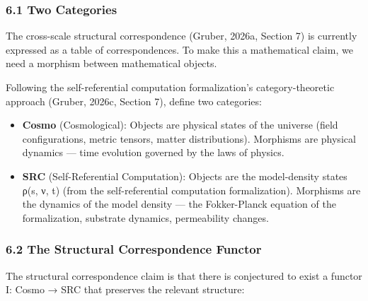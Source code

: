 \documentclass[
]{article}
\begin{document}
\hypertarget{two-categories}{%
\subsubsection{6.1 Two Categories}\label{two-categories}}

The cross-scale structural correspondence (Gruber, 2026a, Section 7) is
currently expressed as a table of correspondences. To make this a
mathematical claim, we need a morphism between mathematical objects.

Following the self-referential computation formalization's
category-theoretic approach (Gruber, 2026c, Section 7), define two
categories:

\begin{itemize}
\item
  \textbf{Cosmo} (Cosmological): Objects are physical states of the
  universe (field configurations, metric tensors, matter distributions).
  Morphisms are physical dynamics --- time evolution governed by the
  laws of physics.
\item
  \textbf{SRC} (Self-Referential Computation): Objects are the
  model-density states ρ(s, ν, t) (from the self-referential computation
  formalization). Morphisms are the dynamics of the model density ---
  the Fokker-Planck equation of the formalization, substrate dynamics,
  permeability changes.
\end{itemize}

\hypertarget{the-structural-correspondence-functor}{%
\subsubsection{6.2 The Structural Correspondence
Functor}\label{the-structural-correspondence-functor}}

The structural correspondence claim is that there is conjectured to
exist a functor I: Cosmo → SRC that preserves the relevant structure:
\end{document}
